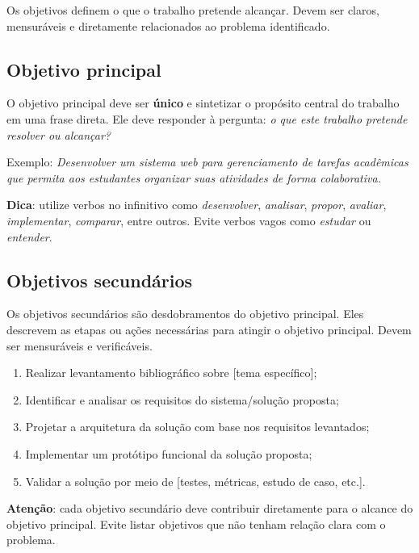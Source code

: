 \documentclass[
    12pt,                %
    openright,           %
    oneside,             %
    a4paper,             %
    english,             %
    brazil               %
]{abntex2}
\begin{document}
Os objetivos definem o que o trabalho pretende alcançar. Devem ser claros, mensuráveis e diretamente relacionados ao problema identificado.

\subsection{Objetivo principal}

O objetivo principal deve ser \textbf{único} e sintetizar o propósito central do trabalho em uma frase direta. Ele deve responder à pergunta: \textit{o que este trabalho pretende resolver ou alcançar?}

Exemplo: \textit{Desenvolver um sistema web para gerenciamento de tarefas acadêmicas que permita aos estudantes organizar suas atividades de forma colaborativa.}

\textbf{Dica}: utilize verbos no infinitivo como \textit{desenvolver}, \textit{analisar}, \textit{propor}, \textit{avaliar}, \textit{implementar}, \textit{comparar}, entre outros. Evite verbos vagos como \textit{estudar} ou \textit{entender}.

\subsection{Objetivos secundários}

Os objetivos secundários são desdobramentos do objetivo principal. Eles descrevem as etapas ou ações necessárias para atingir o objetivo principal. Devem ser mensuráveis e verificáveis.

\begin{enumerate}
    \item Realizar levantamento bibliográfico sobre [tema específico];
    \item Identificar e analisar os requisitos do sistema/solução proposta;
    \item Projetar a arquitetura da solução com base nos requisitos levantados;
    \item Implementar um protótipo funcional da solução proposta;
    \item Validar a solução por meio de [testes, métricas, estudo de caso, etc.].
\end{enumerate}

\textbf{Atenção}: cada objetivo secundário deve contribuir diretamente para o alcance do objetivo principal. Evite listar objetivos que não tenham relação clara com o problema.

\end{document}
